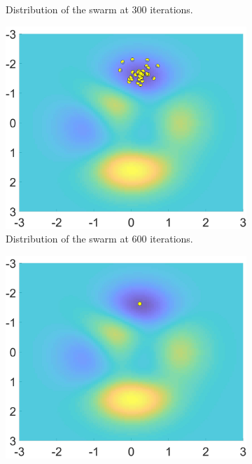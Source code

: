 \begin{figure}[hbp]
\begin{subfigure}[b]{0.5\textwidth}
    \caption{Distribution of the swarm at 300 iterations.}
    \label{fig:f4}
  \end{subfigure}
  \begin{subfigure}[b]{0.5\textwidth}
    \includegraphics[width=\textwidth, height=\textwidth]{"Part 2 - Search-Based Optimization/Particle Swarm Optimization/Images/FIG5.1.jpg"}
    \caption{Distribution of the swarm at 600 iterations.}
    \label{fig:f5}
  \end{subfigure}
   \begin{subfigure}[b]{0.5\textwidth}
    \includegraphics[width=\textwidth, height=\textwidth]{"Part 2 - Search-Based Optimization/Particle Swarm Optimization/Images/FIG8.1.jpg"}

\end{subfigure}
\end{figure}
